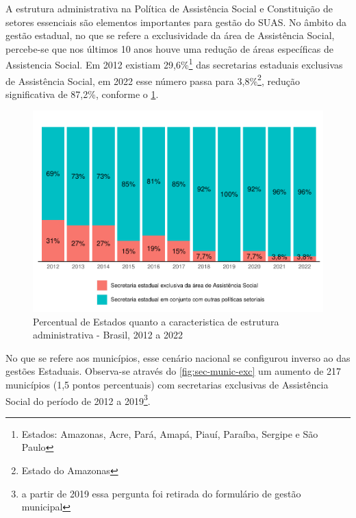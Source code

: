 \documentclass[
  brazilian]{report}
\begin{document}
A estrutura administrativa na Política de Assistência Social e
Constituição de setores essenciais são elementos importantes para gestão
do SUAS. No âmbito da gestão estadual, no que se refere a exclusividade
da área de Assistência Social, percebe-se que nos últimos 10 anos houve
uma redução de áreas específicas de Assistencia Social. Em 2012 existiam
29,6\%\footnote{Estados: Amazonas, Acre, Pará, Amapá, Piauí, Paraíba, Sergipe e São Paulo}
das secretarias estaduais exclusivas de Assistência Social, em 2022 esse
número passa para 3,8\%\footnote{Estado do Amazonas}, redução
significativa de 87,2\%, conforme o \cref{fig:estados_sec_exc}.

\begin{figure}
\includegraphics{Censo-SUAS-2022_files/figure-latex/estados_sec_exc-1} \caption[Percentual de Estados quanto a caracteristica de estrutura administrativa - Brasil, 2012 a 2022]{Percentual de Estados quanto a caracteristica de estrutura administrativa - Brasil, 2012 a 2022}\label{fig:estados_sec_exc}
\end{figure}

No que se refere aos municípios, esse cenário nacional se configurou
inverso ao das gestões Estaduais. Observa-se através do
\cref{fig:sec-munic-exc} um aumento de 217 municípios (1,5 pontos
percentuais) com secretarias exclusivas de Assistência Social do período
de 2012 a
2019\footnote{a partir de 2019 essa pergunta foi retirada do formulário de gestão municipal}.
\end{document}
